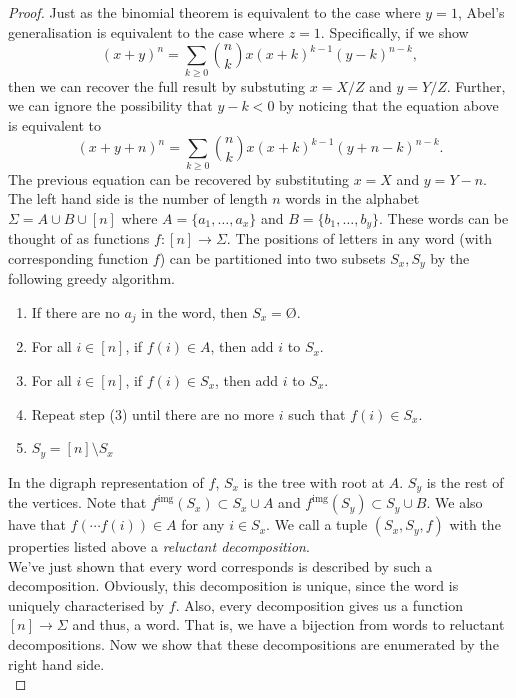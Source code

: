 \begin{proof}
	Just as the binomial theorem is equivalent to the case where $y = 1$, Abel's generalisation is equivalent to the case where $z = 1$. Specifically, if we show
	 \[
		 (x + y)^{n} = \sum_{k \ge 0} \binom{n}{k} x (x + k)^{k - 1} (y - k)^{n - k},
	\]
	then we can recover the full result by substuting $x = X/Z$ and $y = Y/Z$. Further, we can ignore the possibility that $y - k < 0$ by noticing that the equation above is equivalent to
	\[
		(x + y + n)^{n} = \sum_{k \ge 0} \binom{n}{k} x (x + k)^{k - 1} (y + n - k)^{n - k}.
	\]
	The previous equation can be recovered by substituting $x = X$ and $y = Y - n$. \\
	
	The left hand side is the number of length $n$ words in the alphabet $\Sigma = A \cup B \cup [n]$ where $A = \{ a_{1}, \dots, a_{x} \}$ and $B = \{ b_{1}, \dots, b_{y} \}$. These words can be thought of as functions $f : [n] \to \Sigma$. The positions of letters in any word (with corresponding function $f$) can be partitioned into two subsets $S_{x}, S_{y}$ by the following greedy algorithm.
	\begin{enumerate}[label = (\arabic*)]
		\item If there are no $a_{j}$ in the word, then $S_{x} = \text{\O}$.
		\item For all $i \in [n]$, if $f(i) \in A$, then add $i$ to $S_{x}$.
		\item For all $i \in [n]$, if $f(i) \in S_{x}$, then add $i$ to $S_{x}$.
		\item Repeat step (3) until there are no more $i$ such that $f(i) \in S_{x}$.
		\item $S_{y} = [n] \setminus S_{x}$
	\end{enumerate}
	In the digraph representation of $f$, $S_{x}$ is the tree with root at $A$. $S_{y}$ is the rest of the vertices. Note that $f^{\text{img}}(S_{x}) \subset S_{x} \cup A$ and $f^{\text{img}}(S_{y}) \subset S_{y} \cup B$. We also have that $f(\cdots f(i)) \in A$ for any $i \in S_{x}$. We call a tuple $(S_{x}, S_{y}, f)$ with the properties listed above a \emph{reluctant decomposition}. \\

	We've just shown that every word corresponds is described by such a decomposition. Obviously, this decomposition is unique, since the word is uniquely characterised by $f$. Also, every decomposition gives us a function $[n] \to \Sigma$ and thus, a word. That is, we have a bijection from words to reluctant decompositions. Now we show that these decompositions are enumerated by the right hand side. \\


\end{proof}
